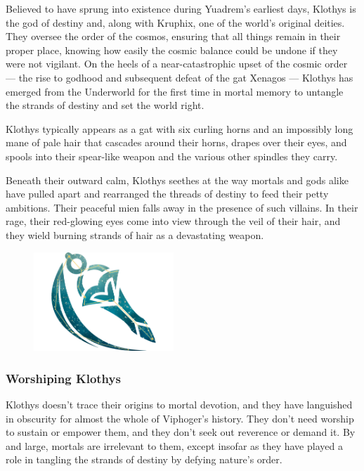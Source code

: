     Believed to have sprung into existence during Yuadrem's earliest days, Klothys is the god of destiny and, along with Kruphix, one of the world's original deities.
    They oversee the order of the cosmos, ensuring that all things remain in their proper place, knowing how easily the cosmic balance could be undone if they were not vigilant.
    On the heels of a near-catastrophic upset of the cosmic order --- the rise to godhood and subsequent defeat of the gat Xenagos --- Klothys has emerged from the Underworld for the first time in mortal memory to untangle the strands of destiny and set the world right.

    Klothys typically appears as a gat with six curling horns and an impossibly long mane of pale hair that cascades around their horns, drapes over their eyes, and spools into their spear-like weapon and the various other spindles they carry.

    Beneath their outward calm, Klothys seethes at the way mortals and gods alike have pulled apart and rearranged the threads of destiny to feed their petty ambitions.
    Their peaceful mien falls away in the presence of such villains.
    In their rage, their red-glowing eyes come into view through the veil of their hair, and they wield burning strands of hair as a devastating weapon.

    \begin{figure}[t]
        \centering
        \includegraphics[width=0.47\textwidth]{02viphoger/img/10s_klothys.png}
    \end{figure}

    \subsubsection{Worshiping Klothys}
        Klothys doesn't trace their origins to mortal devotion, and they have languished in obscurity for almost the whole of Viphoger's history.
        They don't need worship to sustain or empower them, and they don't seek out reverence or demand it.
        By and large, mortals are irrelevant to them, except insofar as they have played a role in tangling the strands of destiny by defying nature's order.

